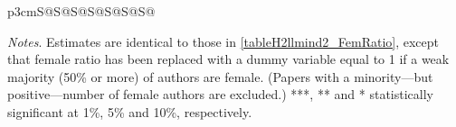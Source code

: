\begin{table}[H]
\begin{threeparttable}
\begin{tabular}{p{3cm}S@{}S@{}S@{}S@{}S@{}S@{}S@{}}
            \bottomrule
        \end{tabular}
        \begin{tablenotes}
            \tiny
            \item \textit{Notes}. Estimates are identical to those in \autoref{tableH2llmind2_FemRatio}, except that female ratio has been replaced with a dummy variable equal to 1 if a weak majority (50\% or more) of authors are female. (Papers with a minority---but positive---number of female authors are excluded.) ***, ** and * statistically significant at 1\%, 5\% and 10\%, respectively.
        \end{tablenotes}
    \end{threeparttable}
\end{table}